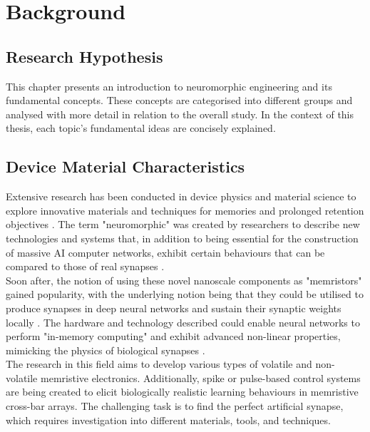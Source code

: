 
\chapter{Background}  %


\section[Research Hypothesis]{Research Hypothesis}

This chapter presents an introduction to neuromorphic engineering and its fundamental concepts.  These concepts are categorised into different groups and analysed with more detail in relation to the overall study. In the context of this thesis, each topic's fundamental ideas are concisely explained. 

\section[Device Material Characteristics]{Device Material Characteristics}

Extensive research has been conducted in device physics and material science to explore innovative materials and techniques for memories and prolonged retention objectives \cite{indiveri2021introducing}.  The term "neuromorphic" was created by researchers to describe new technologies and systems that, in addition to being essential for the construction of massive AI computer networks, exhibit certain behaviours that can be compared to those of real synapses \cite{di2009circuit}. \\

\noindent Soon after, the notion of using these novel nanoscale components as "memristors" gained popularity, with the underlying notion being that they could be utilised to produce synapses in deep neural networks and sustain their synaptic weights locally \cite{jo2010nanoscale}.  The hardware and technology described could enable neural networks to perform "in-memory computing" and exhibit advanced non-linear properties, mimicking the physics of biological synapses \cite{saighi2015plasticity}. \\

\noindent The research in this field aims to develop various types of volatile and non-volatile memristive electronics. Additionally, spike or pulse-based control systems are being created to elicit biologically realistic learning behaviours in memristive cross-bar arrays.  The challenging task is to find the perfect artificial synapse, which requires investigation into different materials, tools, and techniques.

